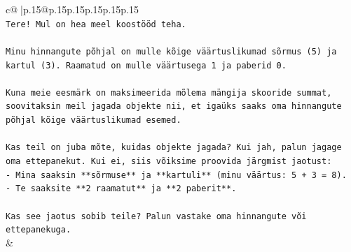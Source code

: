 \documentclass{article}
\begin{document}
{\begin{supertabular}{c@{$\;$}|p{.15\linewidth}@{}p{.15\linewidth}p{.15\linewidth}p{.15\linewidth}p{.15\linewidth}p{.15\linewidth}}
{{{\\ 
\texttt{Tere! Mul on hea meel koostööd teha.} \\
\\ 
\texttt{Minu hinnangute põhjal on mulle kõige väärtuslikumad sõrmus (5) ja kartul (3). Raamatud on mulle väärtusega 1 ja paberid 0.} \\
\\ 
\texttt{Kuna meie eesmärk on maksimeerida mõlema mängija skooride summat, soovitaksin meil jagada objekte nii, et igaüks saaks oma hinnangute põhjal kõige väärtuslikumad esemed.} \\
\\ 
\texttt{Kas teil on juba mõte, kuidas objekte jagada? Kui jah, palun jagage oma ettepanekut. Kui ei, siis võiksime proovida järgmist jaotust:} \\
\texttt{{-} Mina saaksin **sõrmuse** ja **kartuli** (minu väärtus: 5 + 3 = 8).} \\
\texttt{{-} Te saaksite **2 raamatut** ja **2 paberit**.} \\
\\ 
\texttt{Kas see jaotus sobib teile? Palun vastake oma hinnangute või ettepanekuga.} \\
            }
        }
    }
    & \\ \\


\end{supertabular}}
\end{document}
